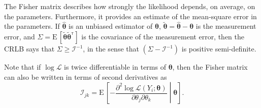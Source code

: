 \documentclass[amsmath,amssymb,aps,prx,reprint,nopreprintnumbers,nofootinbib,showpacs]{revtex4-1}
\newcommand\transpose{\ensuremath{^{^\mathsf{T}}}}
\begin{document}
The Fisher matrix describes how strongly the likelihood depends, on average, on the parameters. Furthermore, it provides an estimate of the mean-square error in the parameters. If $\hat{\bm\theta}$ is an unbiased estimator of $\bm\theta$, $\tilde{\bm\theta} = \hat{\bm\theta} - \bm\theta$ is the measurement error, and $\Sigma = \mathrm{E} \, [\tilde{\bm\theta}\tilde{\bm\theta}\transpose]$ is the covariance of the measurement error, then the \ac{CRLB} says that $\Sigma \geq \mathcal{I}^{-1}$, in the sense that $\left(\Sigma - \mathcal{I}^{-1}\right)$ is positive semi\nobreakdashes-definite.

Note that if $\log\mathcal{L}$ is twice differentiable in terms of $\bm\theta$, then the Fisher matrix can also be written in terms of second derivatives as
%
\begin{equation}\label{eq:general-fisher-matrix-second-derivatives}
    \mathcal{I}_{jk} = \mathrm{E} \, \left[
        -\frac{\partial^2 \log
            \mathcal{L}(Y_i ; \bm\theta)}
            {\partial \theta_j \partial \theta_k}
    \middle| \bm\theta
    \right].
\end{equation}
\end{document}
